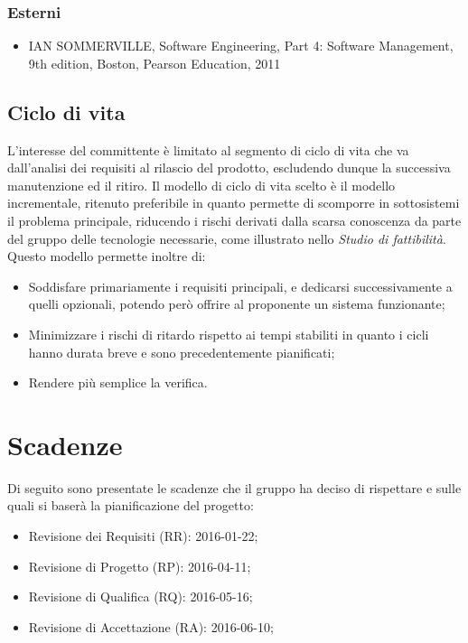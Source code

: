\documentclass[11pt,a4paper]{book}
\begin{document}
\subsubsection{Esterni}
\begin{itemize}
\item IAN SOMMERVILLE, Software Engineering, Part 4: Software Management, 9th edition, Boston, Pearson Education, 2011
\end{itemize}

\subsection{Ciclo di vita}
L’interesse del committente è limitato al segmento di ciclo di vita che va dall’analisi dei requisiti al
rilascio del prodotto, escludendo dunque la successiva manutenzione ed il ritiro. Il modello di ciclo di
vita scelto è il modello incrementale, ritenuto preferibile in quanto permette di scomporre in sottosistemi
il problema principale, riducendo i rischi derivati dalla scarsa conoscenza da parte del gruppo delle
tecnologie necessarie, come illustrato nello \textit{Studio di fattibilità}. Questo modello permette inoltre di:
\begin{itemize}
\item Soddisfare primariamente i requisiti principali, e dedicarsi successivamente a quelli opzionali,
potendo però offrire al proponente un sistema funzionante;
\item Minimizzare i rischi di ritardo rispetto ai tempi stabiliti in quanto i cicli hanno durata breve e
sono precedentemente pianificati;
\item Rendere più semplice la verifica.
\end{itemize}

\section{Scadenze}
Di seguito sono presentate le scadenze che il gruppo ha deciso di rispettare e sulle quali si baserà la pianificazione del progetto:
\begin{itemize}
\item Revisione dei Requisiti (RR): 2016-01-22;
\item Revisione di Progetto (RP): 2016-04-11;
\item Revisione di Qualifica (RQ): 2016-05-16;
\item Revisione di Accettazione (RA): 2016-06-10;
\end{itemize}
\end{document}
